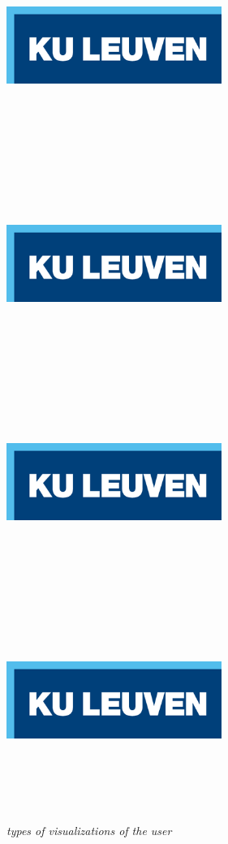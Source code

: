  \begin{figure}[H]
 	\begin{center}
 		\includegraphics[width=7cm, height=7cm]{KUL.png}
 		\includegraphics[width=7cm, height=7cm]{KUL.png}
 		\includegraphics[width=7cm, height=7cm]{KUL.png}
 		\includegraphics[width=7cm, height=7cm]{KUL.png}
 		\caption{\emph{types of visualizations of the user}}
 		\label{fig: a: the UI with real image of user, b: the UI with semi-transparent shadow, c: the UI with puppet, d: the UI with only hands }
 	\end{center}
 \end{figure}
 

